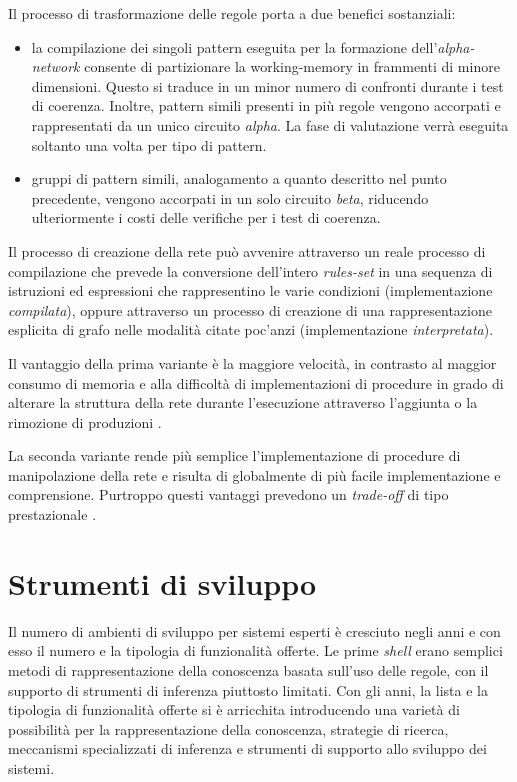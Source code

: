 Il processo di trasformazione delle regole porta a due benefici sostanziali:
\begin{itemize}
	\item la compilazione dei singoli pattern eseguita per la formazione dell'\emph{alpha-network} consente di partizionare la working-memory in frammenti di minore dimensioni. Questo si traduce in un minor numero di confronti durante i test di coerenza. Inoltre, pattern simili presenti in più regole vengono accorpati e rappresentati da un unico circuito \emph{alpha}. La fase di valutazione verrà eseguita soltanto una volta per tipo di pattern.
	\item gruppi di pattern simili, analogamento a quanto descritto nel punto precedente, vengono accorpati in un solo circuito \emph{beta}, riducendo ulteriormente i costi delle verifiche per i test di coerenza.
\end{itemize}

Il processo di creazione della rete può avvenire attraverso un reale processo di compilazione \cite{forgy1982} che prevede la conversione dell'intero \emph{rules-set} in una sequenza di istruzioni ed espressioni che rappresentino le varie condizioni (implementazione \emph{compilata}), oppure attraverso un processo di creazione di una rappresentazione esplicita di grafo nelle modalità citate poc'anzi (implementazione \emph{interpretata}). 

Il vantaggio della prima variante è la maggiore velocità, in contrasto al maggior consumo di memoria e alla difficoltà di implementazioni di procedure in grado di alterare la struttura della rete durante l'esecuzione attraverso l'aggiunta o la rimozione di produzioni \cite{Doorenbos95productionmatching}.

La seconda variante rende più semplice l'implementazione di procedure di manipolazione della rete e risulta di globalmente di più facile implementazione e comprensione. Purtroppo questi vantaggi prevedono un \emph{trade-off} di tipo prestazionale \cite{Doorenbos95productionmatching}.


\section{Strumenti di sviluppo}

Il numero di ambienti di sviluppo per sistemi esperti è cresciuto negli anni e con esso il numero e la tipologia di funzionalità offerte. Le prime \emph{shell} erano semplici metodi di rappresentazione della conoscenza basata sull'uso delle regole, con il supporto di strumenti di inferenza piuttosto limitati. Con gli anni, la lista e la tipologia di funzionalità offerte si è arricchita introducendo una varietà di possibilità per la rappresentazione della conoscenza, strategie di ricerca, meccanismi specializzati di inferenza e strumenti di supporto allo sviluppo dei sistemi.

